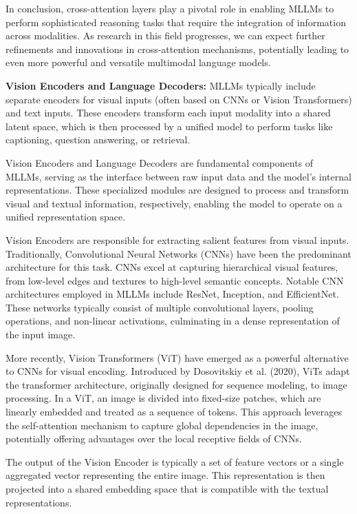 In conclusion, cross-attention layers play a pivotal role in enabling MLLMs to perform sophisticated reasoning tasks that require the integration of information across modalities. As research in this field progresses, we can expect further refinements and innovations in cross-attention mechanisms, potentially leading to even more powerful and versatile multimodal language models.

\textbf{Vision Encoders and Language Decoders:} MLLMs typically include separate encoders for visual inputs (often based on CNNs or Vision Transformers) and text inputs. These encoders transform each input modality into a shared latent space, which is then processed by a unified model to perform tasks like captioning, question answering, or retrieval.

Vision Encoders and Language Decoders are fundamental components of MLLMs, serving as the interface between raw input data and the model's internal representations. These specialized modules are designed to process and transform visual and textual information, respectively, enabling the model to operate on a unified representation space.

Vision Encoders are responsible for extracting salient features from visual inputs. Traditionally, Convolutional Neural Networks (CNNs) have been the predominant architecture for this task. CNNs excel at capturing hierarchical visual features, from low-level edges and textures to high-level semantic concepts. Notable CNN architectures employed in MLLMs include ResNet, Inception, and EfficientNet. These networks typically consist of multiple convolutional layers, pooling operations, and non-linear activations, culminating in a dense representation of the input image.

More recently, Vision Transformers (ViT) have emerged as a powerful alternative to CNNs for visual encoding. Introduced by Dosovitskiy et al. (2020), ViTs adapt the transformer architecture, originally designed for sequence modeling, to image processing. In a ViT, an image is divided into fixed-size patches, which are linearly embedded and treated as a sequence of tokens. This approach leverages the self-attention mechanism to capture global dependencies in the image, potentially offering advantages over the local receptive fields of CNNs.

The output of the Vision Encoder is typically a set of feature vectors or a single aggregated vector representing the entire image. This representation is then projected into a shared embedding space that is compatible with the textual representations.

